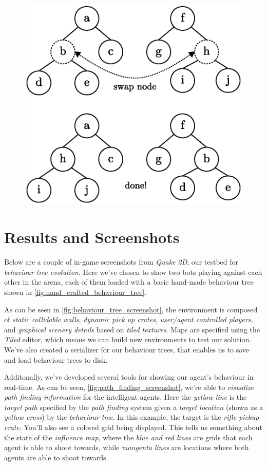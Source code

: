\documentclass[a4paper, twocolumn]{article}
\begin{document}
        \begin{figure}[H]
            \centering
            \includegraphics[width=0.8\linewidth]{share/node_swapping.eps}
            \caption{}
            \label{fig:node_swapping}
        \end{figure}

    \clearpage

    \section{Results and Screenshots} \label{sec:results_and_screenshots}

        Below are a couple of in-game screenshots from \emph{Quake 2D}, our testbed for \emph{behaviour tree evolution}. Here we've chosen to show two bots playing against each other in the arena, each of them loaded with a basic hand-made behaviour tree shown in \cref{fig:hand_crafted_behaviour_tree}.

        As can be seen in \cref{fig:behaviour_tree_screenshot}, the environment is composed of \emph{static collidable walls}, \emph{dynamic pick up crates}, \emph{user/agent controlled players}, and \emph{graphical scenery details} based on \emph{tiled textures}. Maps are specified using the \emph{Tiled} editor, which means we can build new environments to test our solution. We've also created a serializer for our behaviour trees, that enables us to save and load behaviour trees to disk.

        Additonally, we've developed several tools for showing our agent's behaviour in real-time. As can be seen, \cref{fig:path_finding_screenshot}, we're able to \emph{visualize path finding information} for the intelligent agents. Here the \emph{yellow line} is the \emph{target path} specified by the \emph{path finding} system given a \emph{target location} (shown as a \emph{yellow cross}) by the \emph{behaviour tree}. In this example, the target is the \emph{rifle pickup crate}. You'll also see a colored grid being displayed. This tells us something about the state of the \emph{influence map}, where the \emph{blue and red lines} are grids that each agent is able to shoot towards, while \emph{mangenta lines} are locations where both agents are able to shoot towards.
\end{document}
